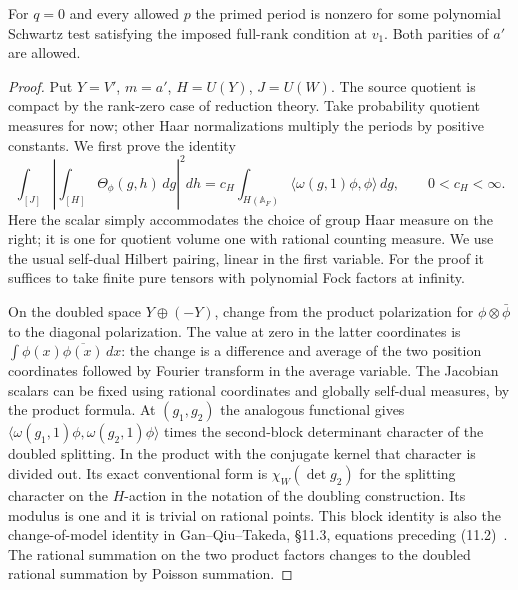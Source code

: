 \begin{theorem}\label{threal:nonzero}
For \(q=0\) and every allowed \(p\) the primed period is nonzero for some polynomial
Schwartz test satisfying the imposed full-rank condition at \(v_1\).
Both parities of \(a'\) are allowed.
\end{theorem}
\begin{proof}
Put \(Y=V'\), \(m=a'\), \(H=U(Y)\), \(J=U(W)\). The source quotient
is compact by the rank-zero case of reduction theory. Take probability
quotient measures for now; other Haar normalizations multiply the
periods by positive constants. We first prove the identity
\begin{equation}\label{threal:norm}
 \int_{[J]}\left|\int_{[H]}\Theta_\phi(g,h)\,dg\right|^2 dh
  = c_H\int_{H(\mathbb A_F)}
                \langle\omega(g,1)\phi,\phi\rangle\,dg,
                 \qquad 0<c_H<\infty .
\end{equation}
Here the scalar simply accommodates the choice of group Haar measure
on the right; it is one for quotient volume one with rational counting
measure. We use the usual self-dual Hilbert pairing, linear in the
first variable. For the proof it suffices to take finite pure tensors
with polynomial Fock factors at infinity.

On the doubled space \(Y\oplus(-Y)\), change from the product
polarization for \(\phi\otimes\bar\phi\) to the diagonal polarization.
The value at zero in the latter coordinates is
\(\int\phi(x)\overline{\phi(x)}\,dx\): the change is a difference and
average of the two position coordinates followed by Fourier transform
in the average variable. The Jacobian scalars can be fixed using
rational coordinates and globally self-dual measures, by the product
formula. At \((g_1,g_2)\) the analogous functional gives
\(\langle\omega(g_1,1)\phi,\omega(g_2,1)\phi\rangle\) times the
second-block determinant character of the doubled splitting. In the
product with the conjugate kernel that character is divided out.
Its exact conventional form is \(\chi_W(\det g_2)\) for the splitting
character on the \(H\)-action in the notation of the doubling
construction. Its modulus is one and it is trivial on rational points.
This block identity is also the change-of-model identity in
Gan--Qiu--Takeda, \S11.3, equations preceding (11.2)~\cite{ganQiuTakeda}.
The rational summation on the two product factors changes to the
doubled rational summation by Poisson summation.


\end{proof}
